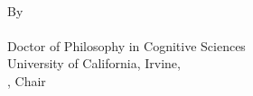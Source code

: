\centering
\vspace{\baselineskip}
\dissertationTitle{} \\[\baselineskip]
By \\[\baselineskip]
\dissertationAuthor{} \\[\baselineskip]
Doctor of Philosophy in Cognitive Sciences \\[\baselineskip]
University of California, Irvine, \the\year{} \\[\baselineskip]
\dissertationChair{}, Chair \\[2\baselineskip]
\raggedright
\doublespacing


